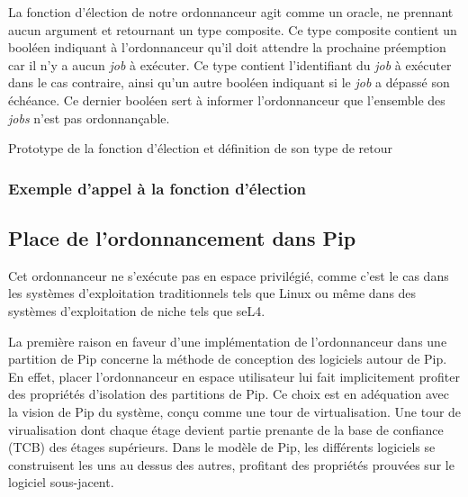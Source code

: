 		La fonction d'élection de notre ordonnanceur agit comme un oracle, ne prennant aucun argument et retournant un type composite. Ce type composite contient un booléen indiquant à l'ordonnanceur qu'il doit attendre la prochaine préemption car il n'y a aucun \emph{job} à exécuter. Ce type contient l'identifiant du \emph{job} à exécuter dans le cas contraire, ainsi qu'un autre booléen indiquant si le \emph{job} a dépassé son échéance. Ce dernier booléen sert à informer l'ordonnanceur que l'ensemble des \emph{jobs} n'est pas ordonnançable.

		\begin{listing}[!ht]
			\caption{Prototype de la fonction d'élection et définition de son type de retour }
		\end{listing}

			\subsubsection{Exemple d'appel à la fonction d'élection}

			\begin{figure}[!ht]
			\end{figure}

			\begin{figure}[!ht]
			\end{figure}

		\subsection{Place de l'ordonnancement dans Pip}

		Cet ordonnanceur ne s'exécute pas en espace privilégié, comme c'est le cas dans les systèmes d'exploitation traditionnels tels que Linux ou même dans des systèmes d'exploitation de niche tels que seL4. 

		La première raison en faveur d'une implémentation de l'ordonnanceur dans une partition de Pip concerne la méthode de conception des logiciels autour de Pip. En effet, placer l'ordonnanceur en espace utilisateur lui fait implicitement profiter des propriétés d'isolation des partitions de Pip. Ce choix est en adéquation avec la vision de Pip du système, conçu comme une tour de virtualisation. Une tour de virualisation dont chaque étage devient partie prenante de la base de confiance (TCB) des étages supérieurs. Dans le modèle de Pip, les différents logiciels se construisent les uns au dessus des autres, profitant des propriétés prouvées sur le logiciel sous-jacent.

